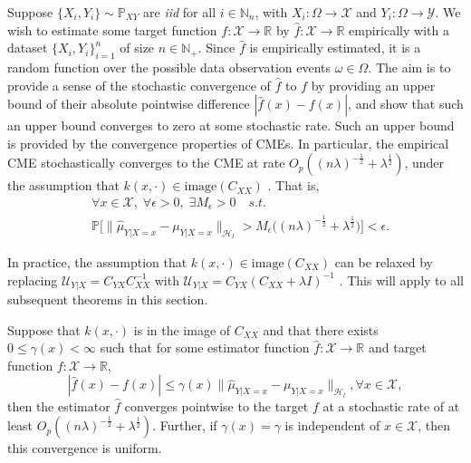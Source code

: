 \documentclass[runningheads, envcountsame, a4paper]{llncs}
\begin{document}
		Suppose $\{X_{i}, Y_{i}\} \sim \mathbb{P}_{X Y}$ are \textit{iid} for all $i \in \mathbb{N}_{n}$, with $X_{i} : \Omega \to \mathcal{X}$ and $Y_{i} : \Omega \to \mathcal{Y}$. We wish to estimate some target function $f : \mathcal{X} \to \mathbb{R}$ by $\hat{f} : \mathcal{X} \to \mathbb{R}$ empirically with a dataset $\{X_{i}, Y_{i}\}_{i = 1}^{n}$ of size $n \in \mathbb{N}_{+}$. Since $\hat{f}$ is empirically estimated, it is a random function over the possible data observation events $\omega \in \Omega$. The aim is to provide a sense of the stochastic convergence of $\hat{f}$ to $f$ by providing an upper bound of their absolute pointwise difference $| \hat{f}(x) - f(x) |$, and show that such an upper bound converges to zero at some stochastic rate. Such an upper bound is provided by the convergence properties of \glspl{CME}. In particular, the empirical \gls{CME} stochastically converges to the \gls{CME} at rate $O_{p}((n \lambda)^{-\frac{1}{2}} + \lambda^{\frac{1}{2}})$, under the assumption that $k(x, \cdot) \in \mathrm{image}(C_{XX})$ \cite[Theorem 6]{song2009hilbert}. That is,
		\begin{equation}
			\begin{aligned}
				&\forall x \in \mathcal{X}, \; \forall \epsilon > 0, \; \exists M_{\epsilon} > 0 \quad s.t.  \\
				&\mathbb{P}\Big[\big\| \hat{\mu}_{Y | X = x} - \mu_{Y | X = x} \big\|_{\mathcal{H}_{l}} > M_{\epsilon} \Big((n \lambda)^{-\frac{1}{2}} + \lambda^{\frac{1}{2}}\Big)\Big] < \epsilon.
			\end{aligned}
		\label{eq:empirical_conditional_embedding_stochastic_convergence}
		\end{equation}
		
		In practice, the assumption that $k(x, \cdot) \in \mathrm{image}(C_{XX})$ can be relaxed by replacing $\mathcal{U}_{Y | X} = C_{YX} C_{XX}^{-1}$ with $\mathcal{U}_{Y | X} = C_{YX} (C_{XX} + \lambda I)^{-1}$ \citep{song2013kernel}. This will apply to all subsequent theorems in this section.
		\begin{theorem}
			\label{thm:pointwise_uniform_convergence}
			Suppose that $k(x, \cdot)$ is in the image of $C_{XX}$ and that there exists $0 \leq \gamma(x) < \infty$ such that for some estimator function $\hat{f} : \mathcal{X} \to \mathbb{R}$ and target function  $f : \mathcal{X} \to \mathbb{R}$,
			\begin{equation}
				| \hat{f}(x) - f(x) | \leq \gamma(x) \big\| \hat{\mu}_{Y | X = x} - \mu_{Y | X = x} \big\|_{\mathcal{H}_{l}}, \forall x \in \mathcal{X},
			\label{eq:estimator_error_bound}
			\end{equation}
			then the estimator $\hat{f}$ converges pointwise to the target $f$ at a stochastic rate of at least $O_{p}((n \lambda)^{-\frac{1}{2}} + \lambda^{\frac{1}{2}})$. Further, if $\gamma(x) = \gamma$ is independent of $x \in \mathcal{X}$, then this convergence is uniform.
		\end{theorem}
		
\end{document}
